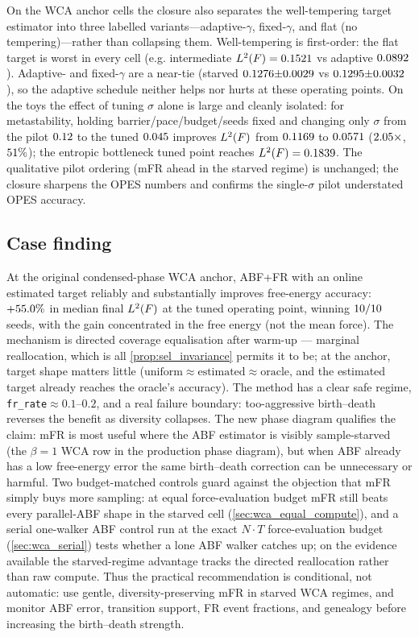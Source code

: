 On the WCA anchor cells the closure also separates the well-tempering target
estimator into three labelled variants---adaptive-$\gamma$, fixed-$\gamma$, and flat
(no tempering)---rather than collapsing them. Well-tempering is first-order: the flat
target is worst in every cell (e.g. intermediate $L^2(F)=0.1521$ vs
adaptive $0.0892$). Adaptive- and fixed-$\gamma$ are a near-tie
(starved $0.1276{\pm}0.0029$ vs
$0.1295{\pm}0.0032$), so the adaptive schedule
neither helps nor hurts at these operating points. On the toys the effect of tuning
$\sigma$ alone is large and cleanly isolated: for metastability, holding
barrier/pace/budget/seeds fixed and changing only $\sigma$ from the pilot
$0.12$ to the tuned $0.045$ improves $L^2(F)$
from $0.1169$ to $0.0571$
($2.05\times$, $51\%$); the entropic bottleneck
tuned point reaches $L^2(F)=0.1839$. The qualitative pilot ordering
(mFR ahead in the starved regime) is unchanged; the closure sharpens the OPES numbers
and confirms the single-$\sigma$ pilot understated OPES accuracy.

\subsection{Case finding}
At the original condensed-phase WCA anchor, ABF+FR with an online estimated target
reliably and substantially improves free-energy accuracy: $+55.0\%$ in
median final $L^2(F)$ at the tuned operating point, winning
$10/10$ seeds, with the gain concentrated in the free energy (not the
mean force). The mechanism is directed coverage equalisation after
warm-up --- marginal reallocation, which is all \cref{prop:sel_invariance} permits it to be; at the anchor, target shape matters little
($\text{uniform}\approx\text{estimated}\approx\text{oracle}$, and the estimated
target already reaches the oracle's accuracy). The method has a clear safe regime,
\texttt{fr\_rate}$\approx0.1$--$0.2$, and a real failure boundary: too-aggressive
birth--death reverses the benefit as diversity collapses. The new phase diagram
qualifies the claim: mFR is most useful where the ABF estimator is visibly
sample-starved (the $\beta=1$ WCA row in the production phase diagram), but when ABF already has a low
free-energy error the same birth--death correction can be unnecessary or harmful.
Two budget-matched controls guard against the objection that mFR simply buys more
sampling: at equal force-evaluation budget mFR still beats every parallel-ABF shape in the
starved cell (\cref{sec:wca_equal_compute}), and a serial one-walker ABF control run at the
exact $N\!\cdot\!T$ force-evaluation budget (\cref{sec:wca_serial}) tests whether a lone ABF
walker catches up; on the evidence available the starved-regime advantage tracks the
directed reallocation rather than raw compute.
Thus the practical recommendation is conditional, not automatic: use gentle,
diversity-preserving mFR in starved WCA regimes, and monitor ABF error,
transition support, FR event fractions, and genealogy before increasing the
birth--death strength.

